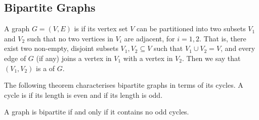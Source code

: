 \subsection{Bipartite Graphs}\label{subsec:Bipartite}

A graph $G = (V, E)$ is  if its vertex set $V$ can be partitioned into two subsets $V_1$ and $V_2$ such that no two vertices in $V_i$ are adjacent, for $i = 1, 2$. That is, there exist two non-empty, disjoint subsets $V_1, V_2 \subseteq V$ such that $V_1 \cup V_2 = V$, and every edge of $G$ (if any) joins a vertex in $V_1$ with a vertex in $V_2$. Then we say that $(V_1, V_2)$ is a  of $G$.

The following theorem characterises bipartite graphs in terms of its cycles. A cycle is  if its length is even and  if its length is odd.

\begin{Theorem}
A graph is bipartite if and only if it contains no odd cycles.
\end{Theorem}


